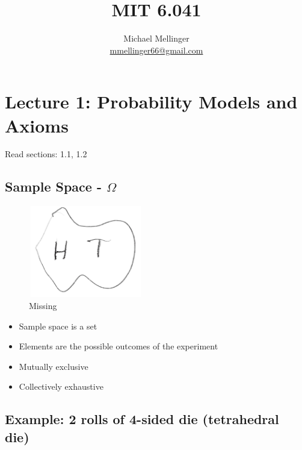 \documentclass{article}
\title{MIT 6.041}
\author{Michael Mellinger \\ \href{mailto:mmellinger66@gmail.com}{mmellinger66@gmail.com} }
\begin{document}
\maketitle
\tableofcontents
\clearpage

\section{Lecture 1: Probability Models and Axioms}

 Read sections: 1.1, 1.2\\


\subsection{Sample Space - \texorpdfstring{$\Omega$}{Omega}}

\begin{figure}[h]
\centering
\includegraphics[width=5cm, height=4cm]{images/L01/IMG_1_1455.jpeg}
\caption{Missing}
\end{figure}

\begin{itemize}
    \item Sample space is a set
    \item Elements are the possible outcomes of the experiment
    \item Mutually exclusive
    \item Collectively exhaustive
\end{itemize}

\subsection{Example: 2 rolls of 4-sided die (tetrahedral die)}
\end{document}
